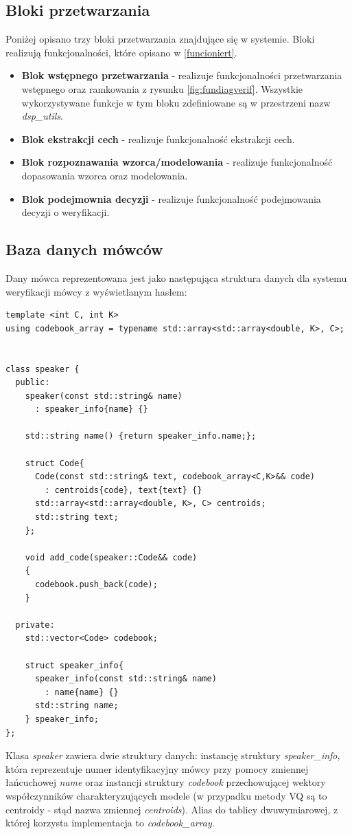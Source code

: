 \subsection{Bloki przetwarzania}
Poniżej opisano trzy bloki przetwarzania znajdujące się w systemie. Bloki realizują funkcjonalności, które opisano w {\ref{funcioniert}}.
\begin{itemize}
\item{\textbf{Blok wstępnego przetwarzania}} - realizuje funkcjonalności przetwarzania wstępnego oraz ramkowania z rysunku {\ref{fig:fundiagverif}}. Wszystkie wykorzystywane funkcje w tym bloku zdefiniowane są w przestrzeni nazw \textit{dsp\_utils}. 
\item{\textbf{Blok ekstrakcji cech\label{archfeatureextraction}}} - realizuje funkcjonalność ekstrakcji cech. 
\item{\textbf{Blok rozpoznawania wzorca/modelowania\label{archpatternmatching}}} - realizuje funkcjonalność dopasowania wzorca oraz modelowania.
\item{\textbf{Blok podejmownia decyzji}} - realizuje funkcjonalność podejmowania decyzji o weryfikacji.
\end{itemize}


\subsection{Baza danych mówców}
Dany mówca reprezentowana jest jako następująca struktura danych dla systemu weryfikacji mówcy z wyświetlanym hasłem:
\begin{lstlisting}[style=lst:cpp, caption=struktura danych przechowująca informację o mówcy\label{lst:database}]
template <int C, int K>
using codebook_array = typename std::array<std::array<double, K>, C>; 


class speaker {
  public:
    speaker(const std::string& name)
      : speaker_info{name} {}  

    std::string name() {return speaker_info.name;};

    struct Code{
      Code(const std::string& text, codebook_array<C,K>&& code)
        : centroids{code}, text{text} {}
      std::array<std::array<double, K>, C> centroids;
      std::string text;
    };

    void add_code(speaker::Code&& code)
    {
      codebook.push_back(code); 
    }

  private:
    std::vector<Code> codebook;

    struct speaker_info{
      speaker_info(const std::string& name)
        : name{name} {}
      std::string name;
    } speaker_info;
};
\end{lstlisting}

Klasa \textit{speaker} zawiera dwie struktury danych: instancję struktury \textit{speaker\_info}, która reprezentuje numer identyfikacyjny mówcy przy pomocy zmiennej łańcuchowej \textit{name} oraz instancji struktury \textit{codebook} przechowującej wektory współczynników charakteryzujących modele (w przypadku metody VQ są to centroidy - stąd nazwa zmiennej \textit{centroids}). Alias do tablicy dwuwymiarowej, z której korzysta implementacja to \textit{codebook\_array}.
